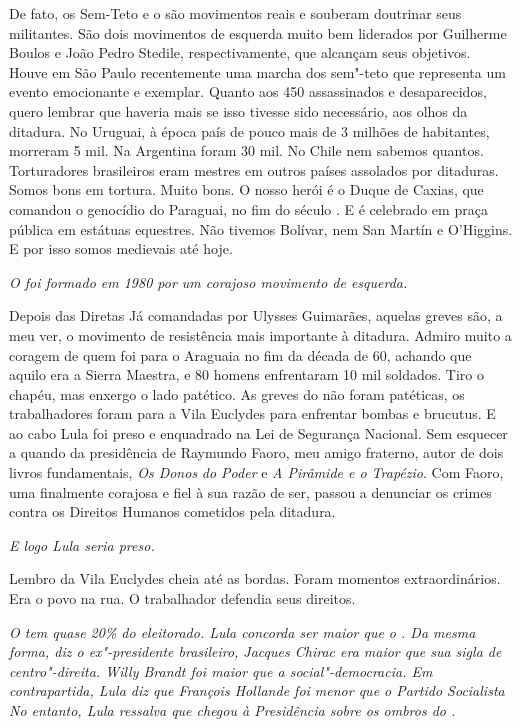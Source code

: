 \normalfont 
De fato, os Sem-Teto e o  são movimentos reais e
souberam doutrinar seus militantes. São dois movimentos de esquerda
muito bem liderados por Guilherme Boulos e João Pedro Stedile,
respectivamente, que alcançam seus objetivos. Houve em São Paulo
recentemente uma marcha dos sem"-teto que representa um evento
emocionante e exemplar. Quanto aos 450 assassinados e desaparecidos,
quero lembrar que haveria mais se isso tivesse sido necessário, aos
olhos da ditadura. No Uruguai, à época país de pouco mais de 3 milhões
de habitantes, morreram 5 mil. Na Argentina foram 30 mil. No Chile nem
sabemos quantos. Torturadores brasileiros eram mestres em outros países
assolados por ditaduras. Somos bons em tortura. Muito bons. O nosso
herói é o Duque de Caxias, que comandou o genocídio do Paraguai, no fim
do século . E é celebrado em praça pública em estátuas equestres. Não
tivemos Bolívar, nem San Martín e O'Higgins. E por isso somos medievais
até hoje.

\itshape
O  foi formado em 1980 por um corajoso movimento de
esquerda.

\normalfont 
Depois das Diretas Já comandadas por Ulysses Guimarães,
aquelas greves são, a meu ver, o movimento de resistência mais
importante à ditadura. Admiro muito a coragem de quem foi para o
Araguaia no fim da década de 60, achando que aquilo era a Sierra
Maestra, e 80 homens enfrentaram 10 mil soldados. Tiro o chapéu, mas
enxergo o lado patético. As greves do  não foram patéticas, os
trabalhadores foram para a Vila Euclydes para enfrentar bombas e
brucutus. E ao cabo Lula foi preso e enquadrado na Lei de Segurança
Nacional. Sem esquecer a  quando da presidência de Raymundo Faoro,
meu amigo fraterno, autor de dois livros fundamentais, \emph{Os Donos}
\emph{do Poder} e \emph{A Pirâmide e o Trapézio}. Com Faoro, uma 
finalmente corajosa e fiel à sua razão de ser, passou a denunciar os
crimes contra os Direitos Humanos cometidos pela ditadura.

\itshape
E logo Lula seria preso.

\normalfont 
Lembro da Vila Euclydes cheia até as bordas. Foram
momentos extraordinários. Era o povo na rua. O trabalhador defendia seus
direitos.

\itshape
O  tem quase 20\% do eleitorado. Lula concorda ser
maior que o . Da mesma forma, diz o ex"-presidente brasileiro, Jacques
Chirac era maior que sua sigla de centro"-direita. Willy Brandt foi maior
que a social"-democracia. Em contrapartida, Lula diz que François
Hollande foi menor que o Partido Socialista No entanto, Lula ressalva
que chegou à Presidência sobre os ombros do .

